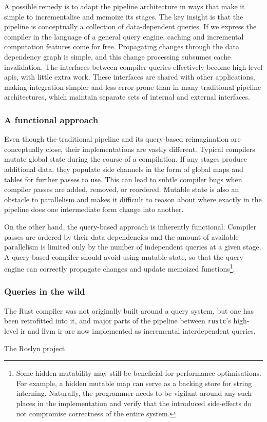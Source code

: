 A possible remedy is to adapt the pipeline architecture in ways that make it
simple to incrementalise and memoize its stages. The key insight is that the
pipeline is conceptually a collection of data-dependent queries. If we express
the compiler in the language of a general query engine, caching and incremental
computation features come for free. Propagating changes through the data
dependency graph is simple, and this change processing subsumes cache
invalidation. The interfaces between compiler queries effectively become
high-level \acrshort{api}s, with little extra work. These interfaces are shared
with other applications, making integration simpler and less error-prone than in
many traditional pipeline architectures, which maintain separate sets of
internal and external interfaces.

\subsubsection*{A functional approach}

Even though the traditional pipeline and its query-based reimagination are
conceptually close, their implementations are vastly different. Typical
compilers mutate global state during the course of a compilation. If any stages
produce additional data, they populate side channels in the form of global maps
and tables for further passes to use. This can lead to subtle compiler bugs when
compiler passes are added, removed, or reordered. Mutable state is also an
obstacle to parallelism and makes it difficult to reason about where exactly in
the pipeline does one intermediate form change into another.

On the other hand, the query-based approach is inherently functional. Compiler
passes are ordered by their data dependencies and the amount of available
parallelism is limited only by the number of independent queries at a given
stage. A query-based compiler should avoid using mutable state, so that the
query engine can correctly propagate changes and update memoized
functions\footnote{Some hidden mutability may still be beneficial for
performance optimisations. For example, a hidden mutable map can serve as a
backing store for string interning. Naturally, the programmer needs to be
vigilant around any such places in the implementation and verify that the
introduced side-effects do not compromise correctness of the entire system.}.

\subsubsection*{Queries in the wild}

The Rust compiler was not originally built around a query system, but one has
been retrofitted into it, and major parts of the pipeline between
\texttt{rustc}'s high-level \acrshort{ir} and \acrshort{llvm} \acrshort{ir} are
now implemented as incremental interdependent queries.

The Roslyn project

